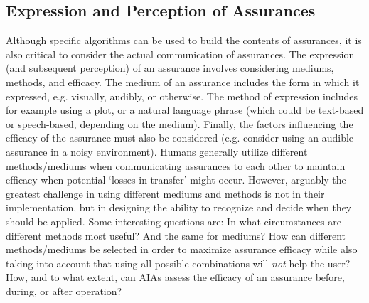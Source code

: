 \subsection{Expression and Perception of Assurances} \label{sec:express_assurances}
Although specific algorithms can be used to build the contents of assurances, it is also critical to consider the actual communication of assurances. The expression (and subsequent perception) of an assurance involves considering mediums, methods, and efficacy. The medium of an assurance includes the form in which it expressed, e.g. visually, audibly, or otherwise. 
The method of expression includes for example using a plot, or a natural language phrase (which could be text-based or speech-based, depending on the medium).  Finally, the factors influencing the efficacy of the assurance must also be considered (e.g. consider using an audible assurance in a noisy environment). Humans generally utilize different methods/mediums when communicating assurances to each other to maintain efficacy when potential `losses in transfer' might occur. 
However, arguably the greatest challenge in using different mediums and methods is not in their implementation, but in designing the ability to recognize and decide when they should be applied. Some interesting questions are: In what circumstances are different methods most useful? And the same for mediums? How can different methods/mediums be selected in order to maximize assurance efficacy while also taking into account that using all possible combinations will \emph{not} help the user? How, and to what extent, can AIAs assess the efficacy of an assurance before, during, or after operation?
